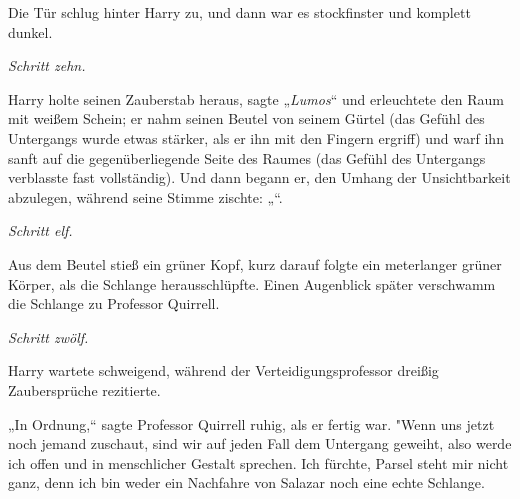 Die Tür schlug hinter Harry zu, und dann war es stockfinster und komplett dunkel.

\emph{Schritt zehn.}

Harry holte seinen Zauberstab heraus, sagte „\emph{Lumos}“ und erleuchtete den Raum mit weißem Schein; er nahm seinen Beutel von seinem Gürtel (das Gefühl des Untergangs wurde etwas stärker, als er ihn mit den Fingern ergriff) und warf ihn sanft auf die gegenüberliegende Seite des Raumes (das Gefühl des Untergangs verblasste fast vollständig). Und dann begann er, den Umhang der Unsichtbarkeit abzulegen, während seine Stimme zischte: „“.

\emph{Schritt elf.}

Aus dem Beutel stieß ein grüner Kopf, kurz darauf folgte ein meterlanger grüner Körper, als die Schlange herausschlüpfte. Einen Augenblick später verschwamm die Schlange zu Professor Quirrell.

\emph{Schritt zwölf.}

Harry wartete schweigend, während der Verteidigungsprofessor dreißig Zaubersprüche rezitierte.

„In Ordnung,“ sagte Professor Quirrell ruhig, als er fertig war. "Wenn uns jetzt noch jemand zuschaut, sind wir auf jeden Fall dem Untergang geweiht, also werde ich offen und in menschlicher Gestalt sprechen. Ich fürchte, Parsel steht mir nicht ganz, denn ich bin weder ein Nachfahre von Salazar noch eine echte Schlange.

